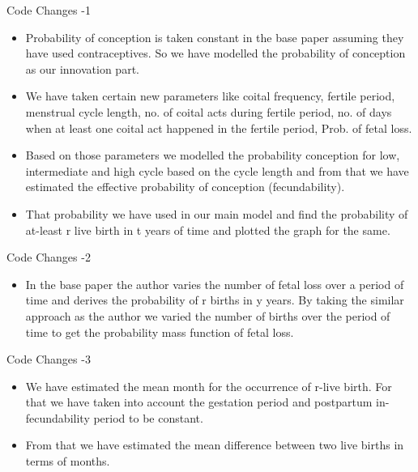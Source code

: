\documentclass{article}
\begin{document}
    {\large Code Changes -1}
\begin{itemize} 
	\item Probability of conception is taken constant in the base paper assuming they have used contraceptives. So we have modelled the probability of conception as our innovation part. 
	\item We have taken certain new parameters like coital frequency, fertile period, menstrual cycle length, no. of coital acts during fertile period, no. of days when at least one coital act happened in the fertile period, Prob. of fetal loss.
	\item Based on those parameters we modelled the probability conception for low, intermediate and high cycle based on the cycle length and from that we have estimated the effective probability of conception (fecundability). 
	\item That probability we have used in our main model and find the probability of at-least r live birth in t years of time and plotted the graph for the same.	
\end{itemize}
{\large Code Changes -2}
\begin{itemize}
	\item In the base paper the author varies the number of fetal loss over a period of time and derives the probability of r births in y years. By taking the similar approach as the author we varied the number of births over the period of time to get the probability mass function of fetal loss.
\end{itemize}
{\large Code Changes -3}
\begin{itemize}
	\item We have estimated the mean month for the occurrence of r-live birth. For that we have taken into account the gestation period and   postpartum in-fecundability period to be constant.
	\item From that we have estimated the mean difference between two live births in terms of months. 
\end{itemize}
\end{document}
